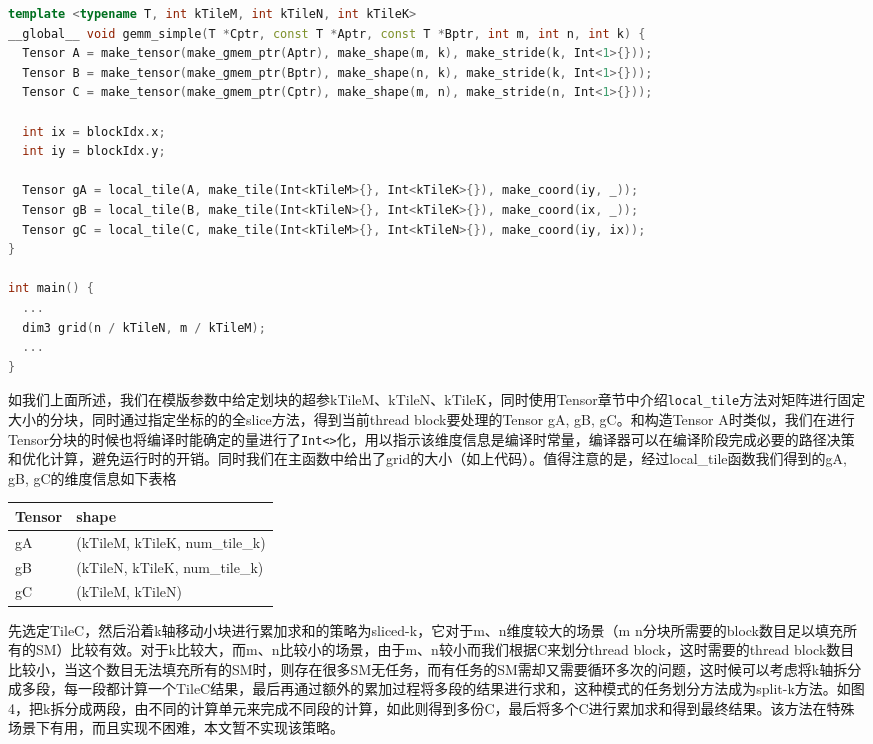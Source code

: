 \begin{lstlisting}[language=C++]
template <typename T, int kTileM, int kTileN, int kTileK>
__global__ void gemm_simple(T *Cptr, const T *Aptr, const T *Bptr, int m, int n, int k) {
  Tensor A = make_tensor(make_gmem_ptr(Aptr), make_shape(m, k), make_stride(k, Int<1>{}));
  Tensor B = make_tensor(make_gmem_ptr(Bptr), make_shape(n, k), make_stride(k, Int<1>{}));
  Tensor C = make_tensor(make_gmem_ptr(Cptr), make_shape(m, n), make_stride(n, Int<1>{}));

  int ix = blockIdx.x;
  int iy = blockIdx.y;

  Tensor gA = local_tile(A, make_tile(Int<kTileM>{}, Int<kTileK>{}), make_coord(iy, _));
  Tensor gB = local_tile(B, make_tile(Int<kTileN>{}, Int<kTileK>{}), make_coord(ix, _));
  Tensor gC = local_tile(C, make_tile(Int<kTileM>{}, Int<kTileN>{}), make_coord(iy, ix));
}

int main() {
  ...
  dim3 grid(n / kTileN, m / kTileM);
  ...
}
\end{lstlisting}

如我们上面所述，我们在模版参数中给定划块的超参kTileM、kTileN、kTileK，同时使用Tensor章节中介绍\lstinline|local_tile|方法对矩阵进行固定大小的分块，同时通过指定坐标的的全slice方法，得到当前thread block要处理的Tensor gA, gB, gC。和构造Tensor A时类似，我们在进行Tensor分块的时候也将编译时能确定的量进行了\lstinline|Int<>|化，用以指示该维度信息是编译时常量，编译器可以在编译阶段完成必要的路径决策和优化计算，避免运行时的开销。同时我们在主函数中给出了grid的大小（如上代码）。值得注意的是，经过local\_tile函数我们得到的gA, gB, gC的维度信息如下表格

\begin{table}[htbp]
\centering
\begin{tabular}{ll}
\toprule
Tensor & shape \\
\midrule
gA & (kTileM, kTileK, num\_tile\_k) \\
gB & (kTileN, kTileK, num\_tile\_k) \\
gC & (kTileM, kTileN) \\
\bottomrule
\end{tabular}
\end{table}

先选定TileC，然后沿着k轴移动小块进行累加求和的策略为sliced-k，它对于m、n维度较大的场景（m n分块所需要的block数目足以填充所有的SM）比较有效。对于k比较大，而m、n比较小的场景，由于m、n较小而我们根据C来划分thread block，这时需要的thread block数目比较小，当这个数目无法填充所有的SM时，则存在很多SM无任务，而有任务的SM需却又需要循环多次的问题，这时候可以考虑将k轴拆分成多段，每一段都计算一个TileC结果，最后再通过额外的累加过程将多段的结果进行求和，这种模式的任务划分方法成为split-k方法。如图4，把k拆分成两段，由不同的计算单元来完成不同段的计算，如此则得到多份C，最后将多个C进行累加求和得到最终结果。该方法在特殊场景下有用，而且实现不困难，本文暂不实现该策略。

